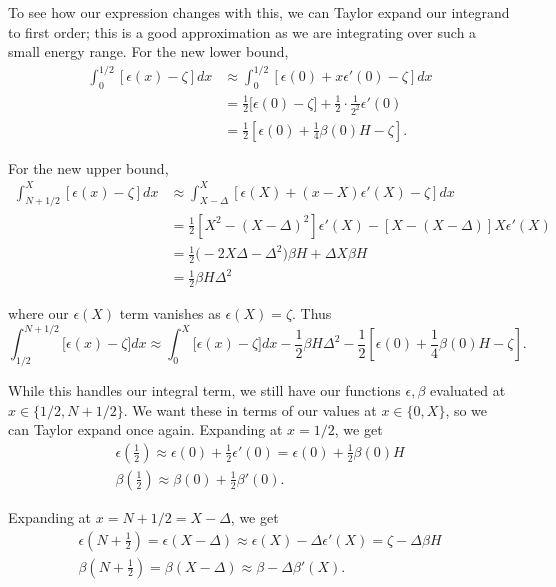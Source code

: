 \documentclass[12pt]{revtex4-2}
\begin{document}
To see how our expression changes with this, we can Taylor expand our integrand to first order; this is a good approximation as we are integrating over such a small energy range.  For the new lower bound, 
\begin{align}
    \int_0^{1/2} [\epsilon(x)-\zeta]dx &\approx \int_0^{1/2} [\epsilon(0) + x\epsilon'(0) - \zeta]dx \\
    &= \frac{1}{2}\big[ \epsilon(0) - \zeta \big] + \frac{1}{2}\cdot\frac{1}{2^2}\epsilon'(0) \\
    &= \frac{1}{2}\left[ \epsilon(0) + \frac{1}{4}\beta(0)H - \zeta \right].
\end{align}

For the new upper bound, 
\begin{align}
    \int_{N+1/2}^{X} [\epsilon(x)-\zeta]dx &\approx \int_{X-\Delta}^{X} [\epsilon(X) + (x-X)\epsilon'(X) - \zeta]dx \\
    &= \frac{1}{2}\left[ X^2 - \left( X-\Delta \right)^2 \right]\epsilon'(X) - \left[X - \left(X-\Delta\right) \right]X\epsilon'(X) \\
    &= \frac{1}{2}\big( -2X\Delta - \Delta^2 \big)\beta H + \Delta X \beta H \\
    &= \frac{1}{2}\beta H \Delta^2
\end{align}

where our $\epsilon(X)$ term vanishes as $\epsilon(X) = \zeta$.  Thus
\begin{equation}
    \int_{1/2}^{N+1/2}\big[\epsilon(x)-\zeta\big]dx \approx \int_0^X \big[\epsilon(x)-\zeta\big]dx - \frac{1}{2}\beta H \Delta^2 - \frac{1}{2}\left[ \epsilon(0) + \frac{1}{4}\beta(0)H - \zeta \right].
\end{equation}

While this handles our integral term, we still have our functions $\epsilon,\beta$ evaluated at $x \in \{1/2,N+1/2\}$.  We want these in terms of our values at $x \in \{0,X\}$, so we can Taylor expand once again.  Expanding at $x=1/2$, we get
\begin{gather}
    \epsilon\left( \frac{1}{2} \right) \approx \epsilon(0) + \frac{1}{2}\epsilon'(0) = \epsilon(0) + \frac{1}{2}\beta(0)H \\
    \beta\left( \frac{1}{2} \right) \approx \beta(0) + \frac{1}{2}\beta'(0).
\end{gather}

Expanding at $x = N + 1/2 = X - \Delta$, we get 
\begin{gather}
    \epsilon\left(N + \frac{1}{2}\right) = \epsilon(X-\Delta) \approx \epsilon(X) - \Delta \epsilon'(X) = \zeta - \Delta \beta H \\
    \beta\left(N + \frac{1}{2}\right) = \beta(X-\Delta) \approx \beta - \Delta \beta'(X).
\end{gather}
\end{document}
